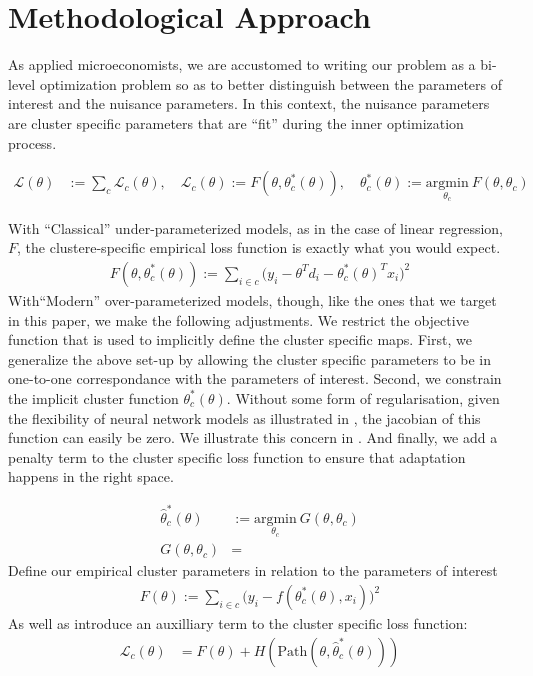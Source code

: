 \documentclass[a4paper,12pt]{article}
\begin{document}
\section{Methodological Approach}

As applied microeconomists, we are accustomed to writing our problem as a bi-level optimization problem so as to better distinguish between the parameters of interest and the nuisance parameters. In this context, the nuisance parameters are cluster specific parameters that are ``fit'' during the inner optimization process. 
 
\begin{align*}
    \mathcal{L}(\theta) &:= \sum _c \mathcal{L}_c(\theta), \quad \mathcal{L}_c(\theta) := F(\theta, \theta^*_c(\theta)), \quad  \theta_c^*(\theta) := \underset{\theta_c}{\textrm{argmin}} \ F(\theta, \theta_c) 
\end{align*}

With “Classical” under-parameterized models, as in the case of linear regression, $F$, the clustere-specific empirical loss function is exactly what you would expect. 
\begin{align*}
    F(\theta, \theta_c^*(\theta)) := \sum _{i \in c}\big(y_i - \theta^Td_i - \theta _c^*(\theta)^Tx_i \big)^2
\end{align*}
 With“Modern” over-parameterized models, though, like the ones that we target in this paper, we make the following adjustments. 
 We restrict the objective function that is used to implicitly define the cluster specific maps. First, we generalize the above set-up by allowing the cluster specific parameters to be in one-to-one correspondance with the parameters of interest. Second, we constrain the implicit cluster function $\theta_c^*(\theta)$. Without some form of regularisation, given the flexibility of neural network models as illustrated in \cite{zhang2021understanding}, the jacobian of this function can easily be zero. We illustrate this concern in . And finally, we add a penalty term to the cluster specific loss function to ensure that adaptation happens in the right space. 
 
 
\begin{align*}
    \hat{\theta}_c^*(\theta) &:= \underset{\theta_c}{\textrm{argmin}} \ G(\theta, \theta_c)  \\
    G(\theta, \theta_c)&= 
\end{align*}
Define our empirical cluster parameters in relation to the parameters of interest 
\begin{align*}
    F(\theta) := \sum _{i \in c}\big(y_i - f(\theta_c^*(\theta), x_i)\big)^2
\end{align*}
As well as introduce an auxilliary term to the cluster specific loss function: 
\begin{align*}
    \mathcal{L}_{c}(\theta) &= F(\theta) + H(\textrm{Path}(\theta, \hat{\theta}^*_c(\theta)))
\end{align*}
\end{document}
